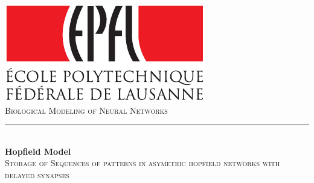 \begin{titlepage}

\newcommand{\HRule}{\rule{\linewidth}{0.5mm}} %


 

\center %
 



\includegraphics{logo_epfl-eps-converted-to}\\[1cm] %

\textsc{\Large Biological Modeling of Neural Networks}\\[0.5cm] %


\HRule \\[0.4cm]
{ \huge \bfseries Hopfield Model}\\[0.4cm] %

\textsc{\large Storage of Sequences of patterns in asymetric hopfield networks with delayed synapses}\\[0.5cm] %


\end{titlepage}
